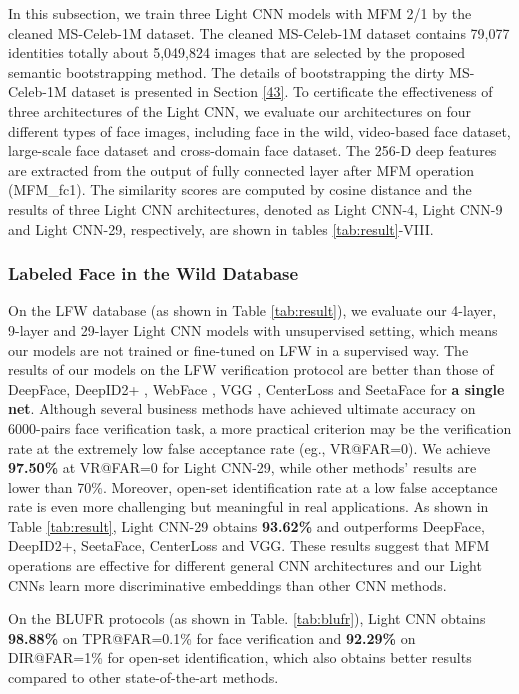 \documentclass[journal,transmag]{IEEEtran}
\begin{document}
In this subsection, we train three Light CNN models with MFM 2/1 by the cleaned MS-Celeb-1M dataset. The cleaned MS-Celeb-1M dataset contains 79,077 identities totally about 5,049,824 images that are selected by the proposed semantic bootstrapping method. The details of bootstrapping the dirty MS-Celeb-1M dataset is presented in Section \ref{43}. To certificate the effectiveness of three architectures of the Light CNN, we evaluate our architectures on four different types of face images, including face in the wild, video-based face dataset, large-scale face dataset and cross-domain face dataset. The 256-D deep features are extracted from the output of fully connected layer after MFM operation (MFM\_fc1). The similarity scores are computed by cosine distance and the results of three Light CNN architectures, denoted as Light CNN-4, Light CNN-9 and Light CNN-29, respectively, are shown in tables \ref{tab:result}-VIII.

\subsubsection{Labeled Face in the Wild Database}
On the LFW database (as shown in Table \ref{tab:result}), we evaluate our 4-layer, 9-layer and 29-layer Light CNN models with unsupervised setting, which means our models are not trained or fine-tuned on LFW in a supervised way. The results of our models on the LFW verification protocol are better than those of DeepFace\cite{taigman2014deepface}, DeepID2+ \cite{DBLP:conf/cvpr/SunWT15}, WebFace \cite{yi2014learning}, VGG \cite{parkhi2015deep}, CenterLoss \cite{wen2016discriminative} and SeetaFace \cite{liu2016viplfacenet} for \textbf{a single net}.
Although several business methods have achieved ultimate accuracy on 6000-pairs face verification task, a more practical criterion may be the verification rate at the extremely low false acceptance rate (eg., VR@FAR=0). We achieve \textbf{97.50\%} at VR@FAR=0 for Light CNN-29, while other methods' results are lower than 70\%. Moreover, open-set identification rate at a low false acceptance rate is even more challenging but meaningful in real applications. As shown in Table \ref{tab:result}, Light CNN-29 obtains \textbf{93.62\%} and outperforms DeepFace, DeepID2+, SeetaFace, CenterLoss and VGG. These results suggest that MFM operations are effective for different general CNN architectures and our Light CNNs learn more discriminative embeddings than other CNN methods.

On the BLUFR protocols (as shown in Table. \ref{tab:blufr}), Light CNN obtains \textbf{98.88\%} on TPR@FAR=0.1\% for face verification and  \textbf{92.29\%} on DIR@FAR=1\% for open-set identification, which also obtains better results compared to other state-of-the-art methods.
\end{document}
